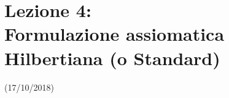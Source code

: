 \documentclass[12pt]{article}
\begin{document}
\section{Lezione 4:\\ \large{Formulazione assiomatica Hilbertiana (o Standard)}}
\vspace{-1em}
\begin{center}
    \small{(17/10/2018)}
\end{center}
\end{document}
